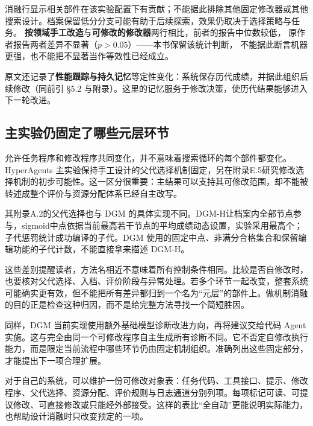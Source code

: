 \begin{sloppypar}
消融行显示相关部件在该实验配置下有贡献；不能据此排除其他固定修改器或其他搜索设计。档案保留低分分支可能有助于后续探索，效果仍取决于选择策略与任务。
\textbf{按领域手工改造}与\textbf{可修改的修改器}两行相比，前者的报告中位数较低，
原作者报告两者差异不显著（$p>0.05$）——本书保留该统计判断，
不能据此断言机器更强，也不能把不显著当作等效性已经成立。
\end{sloppypar}

\begin{sloppypar}
原文还记录了\textbf{性能跟踪与持久记忆}等定性变化：系统保存历代成绩，并据此组织后续修改（同前引 §5.2 与附录）。这里的记忆服务于修改决策，使历代结果能够进入下一轮改进。
\end{sloppypar}

\subsection{主实验仍固定了哪些元层环节}
\label{sec:ch12-fixedboundary}

允许任务程序和修改程序共同变化，并不意味着搜索循环的每个部件都变化。HyperAgents 主实验保持手工设计的父代选择机制固定，另在附录E.5研究修改选择机制的初步可能性\cite{hyperagents-2603}。这一区分很重要：主结果可以支持其可修改范围，却不能被转述成整个评价与资源分配体系已经自主改写。

其附录A.2的父代选择也与 DGM 的具体实现不同。DGM-H让档案内全部节点参与，sigmoid中点依据当前最高若干节点的平均成绩动态设置，实验采用最高个；子代惩罚统计成功编译的子代\cite{hyperagents-2603}。DGM 使用的固定中点、非满分合格集合和保留编辑功能的子代计数，不能直接拿来描述 DGM-H。

这些差别提醒读者，方法名相近不意味着所有控制条件相同。比较是否自修改时，也要核对父代选择、入档、评价阶段与异常处理。若多个环节一起改变，整套系统可能确实更有效，但不能把所有差异都归到一个名为“元层”的部件上。做机制消融的目的正是检查这种归因，而不是给完整方法寻找一个简短胜因。

同样，DGM 当前实现使用额外基础模型诊断改进方向，再将建议交给代码 Agent 实施\cite{dgm-2505}。这与完全由同一个可修改程序自主生成所有诊断不同。它不否定自修改执行能力，而是限定当前流程中哪些环节仍由固定机制组织。准确列出这些固定部分，才能提出下一项合理扩展。

对于自己的系统，可以维护一份可修改对象表：任务代码、工具接口、提示、修改程序、父代选择、资源分配、评价规则与日志通道分别列项。每项标记可读、可提议修改、可直接修改或只能经外部接受。这样的表比“全自动”更能说明实际能力，也帮助设计消融时只改变预定的一项。

